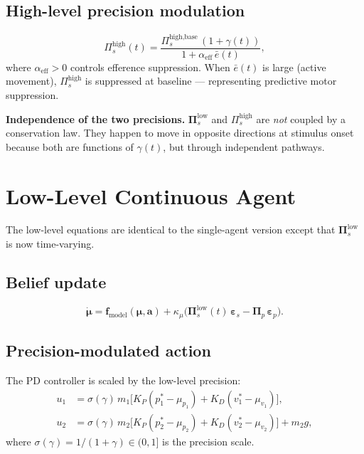 \documentclass[11pt, a4paper]{article}
\newcommand{\vect}[1]{\bm{#1}}
\newcommand{\mat}[1]{\mathbf{#1}}
\newcommand{\Pip}{\mat{\Pi}_p}
\newcommand{\Pisl}{\mat{\Pi}_s^{\text{low}}}
\newcommand{\Pish}{\Pi_s^{\text{high}}}
\newcommand{\epsp}{\vect{\varepsilon}_p}
\newcommand{\epss}{\vect{\varepsilon}_s}
\begin{document}
\subsection{High-level precision modulation}
\begin{equation}
  \boxed{
  \Pish(t) = \frac{\Pi_s^{\text{high,base}}\,(1+\gamma(t))}{1 + \alpha_{\text{eff}}\,\bar{e}(t)},
  }
  \label{eq:pish}
\end{equation}
where $\alpha_{\text{eff}} > 0$ controls efference suppression.
When $\bar{e}(t)$ is large (active movement), $\Pish$ is suppressed at
baseline — representing predictive motor suppression.

\begin{notebox}
\textbf{Independence of the two precisions.}
$\Pisl$ and $\Pish$ are \emph{not} coupled by a conservation law.
They happen to move in opposite directions at stimulus onset because
both are functions of $\gamma(t)$, but through independent pathways.
\end{notebox}

\section{Low-Level Continuous Agent}
\label{sec:low}

The low-level equations are identical to the single-agent version
except that $\Pisl$ is now time-varying.

\subsection{Belief update}
\begin{equation}
  \dot{\vect{\mu}} = \vect{f}_{\text{model}}(\vect{\mu}, \vect{a})
    + \kappa_\mu\bigl(\Pisl(t)\,\epss - \Pip\,\epsp\bigr).
  \label{eq:mu_dot}
\end{equation}

\subsection{Precision-modulated action}
The PD controller is scaled by the low-level precision:
\begin{align}
  u_1 &= \sigma(\gamma)\,m_1\bigl[K_P(p_1^*-\mu_{p_1})
         + K_D(v_1^*-\mu_{v_1})\bigr], \label{eq:u1}\\
  u_2 &= \sigma(\gamma)\,m_2\bigl[K_P(p_2^*-\mu_{p_2})
         + K_D(v_2^*-\mu_{v_2})\bigr] + m_2 g, \label{eq:u2}
\end{align}
where $\sigma(\gamma) = 1/(1+\gamma) \in (0,1]$ is the precision scale.
\end{document}
